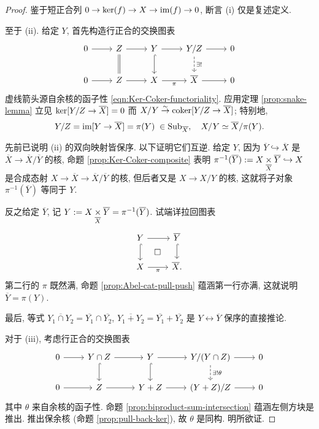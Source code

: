 \begin{proof}
	鉴于短正合列 $0 \to \operatorname{ker}(f) \to X \to \operatorname{im}(f) \to 0$, 断言 (i) 仅是复述定义.
	
	至于 (ii). 给定 $Y$, 首先构造行正合的交换图表
	\[\begin{tikzcd}
		0 \arrow[r] & Z \arrow[r] \arrow[equal, d] & Y \arrow[r] \arrow[hookrightarrow, d] & Y/Z \arrow[dashed, d, "\exists!"] \arrow[r] & 0 \\
		0 \arrow[r] & Z \arrow[r] & X \arrow[r, "\pi"'] & \overline{X} \arrow[r] & 0
	\end{tikzcd}\]
	虚线箭头源自余核的函子性 \eqref{eqn:Ker-Coker-functoriality}. 应用定理 \ref{prop:snake-lemma} 立见 $\operatorname{ker}[Y/Z \to \overline{X}] = 0$ 而 $X/Y \stackrel{\sim}{\rightarrow} \operatorname{coker}[Y/Z \to \overline{X}]$; 特别地,
	\[ Y/Z =  \operatorname{im}[Y \to \overline{X}] = \pi(Y) \;\in \mathrm{Sub}_{\overline{X}}, \quad X/Y \simeq \overline{X}/\pi(Y). \]
	
	先前已说明 (ii) 的双向映射皆保序. 以下证明它们互逆. 给定 $Y$, 因为 $\overline{Y} \hookrightarrow \overline{X}$ 是 $\overline{X} \to \overline{X}/\overline{Y}$ 的核, 命题 \ref{prop:Ker-Coker-composite} 表明 $\pi^{-1}(\overline{Y}) := X \underset{\overline{X}}{\times} \overline{Y} \hookrightarrow X$ 是合成态射 $X \to \overline{X} \to \overline{X}/\overline{Y}$ 的核, 但后者又是 $X \to X/Y$ 的核, 这就将子对象 $\pi^{-1}(\overline{Y})$ 等同于 $Y$.
	
	反之给定 $\overline{Y}$, 记 $Y := X \underset{\overline{X}}{\times} \overline{Y} = \pi^{-1} (\overline{Y})$. 试端详拉回图表
	\[\begin{tikzcd}
		Y \arrow[r] \arrow[hookrightarrow, d] & \overline{Y} \arrow[hookrightarrow, d] \\
		X \arrow[r, "\pi"'] & \overline{X} \arrow[phantom, lu, "\Box" description] .
	\end{tikzcd}\]
	第二行的 $\pi$ 既然满, 命题 \ref{prop:Abel-cat-pull-push} 蕴涵第一行亦满, 这就说明 $\overline{Y} = \pi(Y)$.
	
	最后, 等式 $\overline{Y_1 \cap Y_2} = \overline{Y_1} \cap \overline{Y_2}$, $\overline{Y_1 + Y_2} = \overline{Y_1} + \overline{Y_2}$ 是 $Y \leftrightarrow \overline{Y}$ 保序的直接推论.

	对于 (iii), 考虑行正合的交换图表
	\[\begin{tikzcd}
		0 \arrow[r] & Y \cap Z \arrow[r] \arrow[hookrightarrow, d] & Y \arrow[hookrightarrow, d] \arrow[r] & Y/(Y \cap Z) \arrow[r] \arrow[dashed, d, "\exists! \theta"] & 0 \\
		0 \arrow[r] & Z \arrow[r] & Y+Z \arrow[r] & (Y+Z)/Z \arrow[r] & 0
	\end{tikzcd}\]
	其中 $\theta$ 来自余核的函子性. 命题 \ref{prop:biproduct-sum-intersection} 蕴涵左侧方块是推出. 推出保余核 (命题 \ref{prop:pull-back-ker}), 故 $\theta$ 是同构. 明所欲证.
\end{proof}

